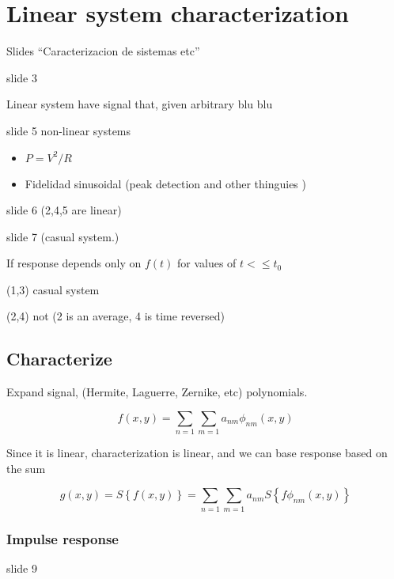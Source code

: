 \documentclass[../main/main.tex]{subfiles}
\begin{document}
\section{Linear system characterization}

Slides ``Caracterizacion de sistemas etc''



slide 3

Linear system have signal that, given arbitrary blu blu

slide 5 non-linear systems

\begin{itemize}
	\item $P=V^{2}/R$
	\item Fidelidad sinusoidal (peak detection and other thinguies )

\end{itemize}


slide 6 (2,4,5 are linear)

slide 7 (casual system.)

If response depends only on $f(t)$ for values of $t<\leq t_{0}$

(1,3) casual system

(2,4) not (2 is an average, 4 is time reversed)


\subsection{Characterize}

Expand signal, (Hermite, Laguerre, Zernike, etc) polynomials.

\begin{equation}
f(x,y) = \sum_{n=1}\sum_{m=1} a_{nm} \phi_{nm}(x,y)
\end{equation}

Since it is linear, characterization is linear, and we can base response based on the sum

\begin{equation}
g(x,y) = S\left\{f(x,y)\right\} = \sum_{n=1}\sum_{m=1} a_{nm} S\left\{f\phi_{nm}(x,y)\right\}
\end{equation}

\subsubsection{Impulse response}

\newcommand{\hh}{h(x,y,\eta,\phi)}

slide 9
\end{document}
